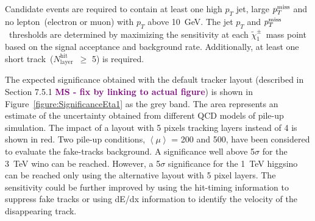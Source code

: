 \documentclass[11pt,twoside,a4paper]{cernrep}
\newcommand{\MS}[1]{\textbf{\textcolor{purple}{MS - #1}}}
\begin{document}
Candidate events are required to contain at least one high $p_{T}$ jet, large \ensuremath{p_{T}^{\rm{miss}}} and no lepton~(electron or muon) with $p_{T}$ above 10~GeV.
The jet $p_{T}$ and \ensuremath{p_{T}^{\rm{miss}}}~thresholds are determined by maximizing the sensitivity at each \ensuremath{\tilde{\chi}_{1}^{\pm}}~mass point based on the signal acceptance and background rate. Additionally, at least one short track~(\ensuremath{N_{\mathrm{layer}}^{\mathrm{hit}}}~$\geq$ 5) is required.

The expected significance obtained with the default tracker layout (described in Section 7.5.1 \MS{fix by linking to actual figure}) is shown in Figure~\ref{figure:SignificanceEta1} as the grey band.  The area represents an estimate of the uncertainty obtained from different QCD models of pile-up simulation. The impact of a layout with 5 pixels tracking layers instead of 4 is shown in red. Two pile-up conditions, $\left< \mu \right>$ {=} 200 and 500, have been considered to evaluate the fake-tracks background. A significance well above 5$\sigma$ for the 3~TeV wino can be reached. However, a 5$\sigma$ significance for the 1~TeV higgsino can be reached only using the alternative layout with 5 pixel layers. The sensitivity could be further improved by using the hit-timing information to suppress fake tracks or using dE/dx information to identify the velocity of the disappearing track.
\end{document}
